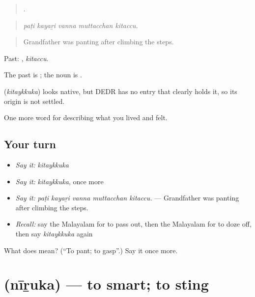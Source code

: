 \begin{quote}
    .
\end{quote}

\begin{quote}
\emph{paṭi kayaṟi vanna muttacchan kitaccu.}
\end{quote}

\begin{quote}
Grandfather was panting after climbing the steps.
\end{quote}

Past: , \emph{kitaccu}.

The past is ; the noun is .

\begin{cousinweb}
\textbf{} (\emph{kitaykkuka}) looks native, but DEDR has no entry that clearly holds it, so its origin is not settled.
\end{cousinweb}

\begin{grammarlens}[title={What you've built}]
One more word for describing what you lived and felt.
\end{grammarlens}

\subsection*{Your turn}
\begin{itemize}
\raggedright
  \item \emph{Say it:} \emph{kitaykkuka}
  \item \emph{Say it:} \emph{kitaykkuka}, once more
  \item \emph{Say it:} \emph{paṭi kayaṟi vanna muttacchan kitaccu.} — Grandfather was panting after climbing the steps.
  \item \emph{Recall:} say the Malayalam for to pass out, then the Malayalam for to doze off, then say \emph{kitaykkuka} again
\end{itemize}

\begin{tcolorbox}[breakable,colback=teal!4,colframe=teal!35!black,title={Before you move on}]
What does  mean? (\textquotedblleft{}To pant; to gasp\textquotedblright{}.) Say it once more.
\end{tcolorbox}
\section[\texorpdfstring{\ml{നീറുക} (nīṟuka)}{നീറുക (nīṟuka)}]{ (nīṟuka) — to smart; to sting}


